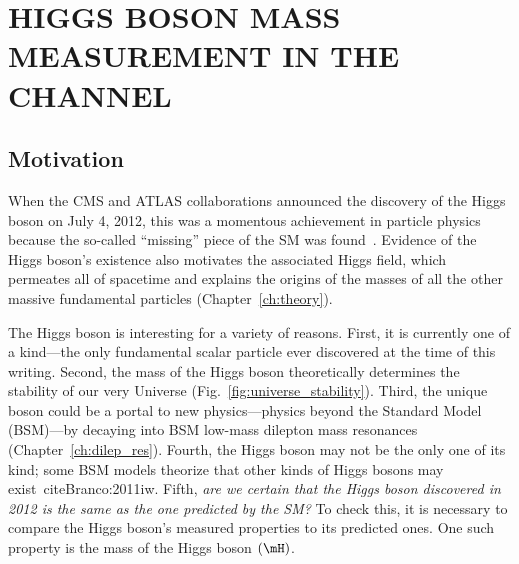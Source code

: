\chapter{HIGGS BOSON MASS MEASUREMENT IN THE \texorpdfstring{\hzzfourl}{H to ZZ to 4l} CHANNEL}
\label{ch:higgs_mass}
\section{Motivation}
\label{sec:higgs_motivation}
When the CMS and ATLAS collaborations announced the discovery of the Higgs boson on July 4, 2012,
this was a momentous achievement in particle physics because the so-called ``missing'' piece of the SM was found~\cite{chatrchyan_observation_2012, aad_observation_2012, chatrchyan_observation_2013}.
Evidence of the Higgs boson's existence also motivates the associated Higgs field, which permeates all of spacetime and explains the origins of the masses of all the other massive fundamental particles (Chapter~\ref{ch:theory}).

The Higgs boson is interesting for a variety of reasons.
First, it is currently one of a kind---the only fundamental scalar particle ever discovered at the time of this writing.
Second, the mass of the Higgs boson theoretically determines the stability of our very Universe (Fig.~\ref{fig:universe_stability}).
Third, the unique boson could be a portal to new physics---\ie physics beyond the Standard Model (BSM)---\eg by decaying into BSM low-mass dilepton mass resonances (Chapter~\ref{ch:dilep_res}).
Fourth, the Higgs boson may not be the only one of its kind; some BSM models theorize that other kinds of Higgs bosons may exist~cite{Branco:2011iw}.
Fifth, \emph{are we certain that the Higgs boson discovered in 2012 is the same as the one predicted by the SM?}
To check this, it is necessary to compare the Higgs boson's measured properties to its predicted ones.
One such property is the mass of the Higgs boson $\left( \mH \right)$.

